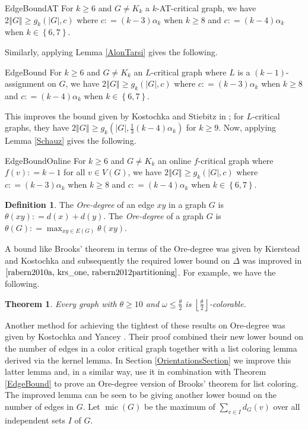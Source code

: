 \documentclass[12pt]{article}
\theoremstyle{plain}
\newtheorem{thm}{Theorem}[section]
\theoremstyle{definition}
\newtheorem{defn}{Definition}
\theoremstyle{remark}
\newcommand{\set}[1]{\left\{ #1 \right\}}
\newcommand{\card}[1]{\left|#1\right|}
\newcommand{\size}[1]{\left\Vert#1\right\Vert}
\newcommand{\floor}[1]{\left\lfloor#1\right\rfloor}
\newcommand{\DefinedAs}{\mathrel{\mathop:}=}
\newcommand{\mic}{\operatorname{mic}}
\begin{document}
\begin{repthm}{EdgeBoundAT}
For $k \geq 6$ and $G \neq K_k$ a $k$-AT-critical graph, we have $2\size{G} \geq g_k(\card{G}, c)$ where $c \DefinedAs (k-3)\alpha_k$ when $k \geq 8$ and $c \DefinedAs (k-4)\alpha_k$ when $k \in \set{6,7}$.
\end{repthm}

\noindent Similarly, applying Lemma \ref{AlonTarsi} gives the following.

\begin{repthm}{EdgeBound}
For $k \geq 6$ and $G \neq K_k$ an $L$-critical graph where $L$ is a $(k-1)$-assignment on $G$, we have  $2\size{G} \geq g_k(\card{G}, c)$ where $c \DefinedAs (k-3)\alpha_k$ when $k \geq 8$ and $c \DefinedAs (k-4)\alpha_k$ when $k \in \set{6,7}$.
\end{repthm}

This improves the bound given by Kostochka and Stiebitz in \cite{kostochkastiebitzedgesincriticalgraph}; for $L$-critical graphs, they have $2\size{G} \geq g_k(\card{G}, \frac13 (k-4)\alpha_k)$ for $k \geq 9$.  Now, applying Lemma \ref{Schauz} gives the following.

\begin{repthm}{EdgeBoundOnline}
For $k \geq 6$ and $G \neq K_k$ an online $f$-critical graph where $f(v) \DefinedAs k-1$ for all $v \in V(G)$, we have  $2\size{G} \geq g_k(\card{G}, c)$ where $c \DefinedAs (k-3)\alpha_k$ when $k \geq 8$ and $c \DefinedAs (k-4)\alpha_k$ when $k \in \set{6,7}$.
\end{repthm}

\begin{defn}
The \emph{Ore-degree} of an edge $xy$ in a graph $G$ is $\theta(xy) \DefinedAs d(x) + d(y)$.  The \emph{Ore-degree} of a graph $G$ is $\theta(G) \DefinedAs \max_{xy \in E(G)}\theta(xy)$.
\end{defn}

A bound like Brooks' theorem in terms of the Ore-degree was given by Kierstead and Kostochka \cite{kierstead2009ore} and subsequently the required lower bound on $\Delta$ was improved in $\cite{rabern2010a, krs_one, rabern2012partitioning}$.  For example, we have the following.

\begin{thm}\label{RegularOre}
Every graph with $\theta \geq 10$ and $\omega \leq \frac{\theta}{2}$ is $\floor{\frac{\theta}{2}}$-colorable.
\end{thm}

Another method for achieving the tightest of these results on Ore-degree was given by Kostochka and Yancey \cite{kostochkayancey2012ore}.  Their proof combined their new lower bound on the number of edges in a color critical graph together with a list coloring lemma derived via the kernel lemma.  In Section \ref{OrientationsSection} we improve this latter lemma and, in a similar way, use it in combination with Theorem \ref{EdgeBound} to prove an Ore-degree version of Brooks' theorem for list coloring.  The improved lemma can be seen to be giving another lower bound on the number of edges in $G$. Let $\mic(G)$ be the maximum of $\sum_{v \in I} d_G(v)$ over all independent sets $I$ of $G$.
\end{document}
